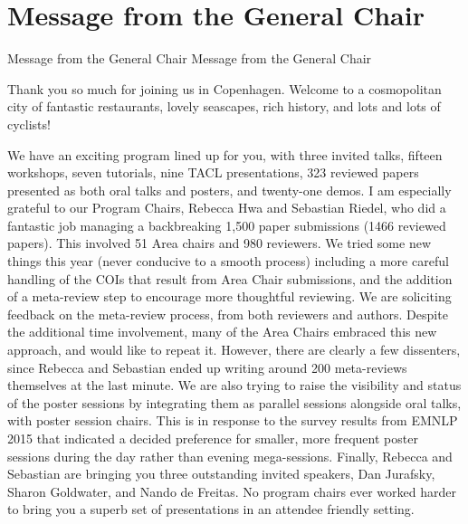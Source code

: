 \section{Message from the General Chair}\vspace{2em}
\setheaders%
    {Message from the General Chair}%
    {Message from the General Chair}
\thispagestyle{emptyheader}

\setlength{\parskip}{1ex}

Thank you so much for joining us in Copenhagen.  Welcome to a cosmopolitan city of fantastic restaurants, lovely seascapes, rich history, and lots and lots of cyclists! 

We have an exciting program lined up for you, with three invited talks, fifteen workshops, seven tutorials, nine TACL presentations, 323 reviewed papers presented as both oral talks and posters, and twenty-one demos.  I am especially grateful to our Program Chairs, Rebecca Hwa and Sebastian Riedel, who did a fantastic job managing a backbreaking 1,500 paper submissions (1466 reviewed papers).  This involved 51 Area chairs and 980 reviewers.  We tried some new things this year (never conducive to a smooth process) including a more careful handling of the COIs that result from Area Chair submissions, and the addition of a meta-review step to encourage more thoughtful reviewing.  We are soliciting feedback on the meta-review process, from both reviewers and authors.  Despite the additional time involvement, many of the Area Chairs embraced this new approach, and would like to repeat it. However, there are clearly a few dissenters, since Rebecca and Sebastian ended up writing around 200 meta-reviews themselves at the last minute.  We are also trying to raise the visibility and status of the poster sessions by integrating them as parallel sessions alongside oral talks, with poster session chairs.  This is in response to the survey results from EMNLP 2015 that indicated a decided preference for smaller, more frequent poster sessions during the day rather than evening mega-sessions.  Finally, Rebecca and Sebastian are bringing you three outstanding invited speakers, Dan Jurafsky, Sharon Goldwater, and Nando de Freitas.   No program chairs ever worked harder to bring you a superb set of presentations in an attendee friendly setting.

